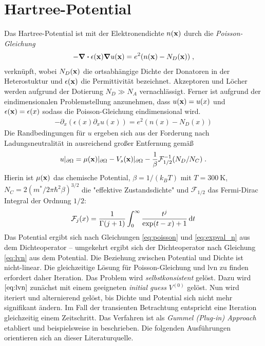 \section{Hartree-Potential}\label{sec:A_4}
Das Hartree-Potential ist mit der Elektronendichte $n(\vb{x})$ durch die \emph{Poisson-Gleichung} \cite{frensley}
\begin{align}
  -\div \epsilon(\vb{x}) \grad u(\vb{x}) = e^2 (n(\vb{x}) - N_D(\vb{x})) \; ,
  \label{eq:poisson_3d}
\end{align}
verknüpft, wobei $N_D(\vb{x})$ die ortsabhängige Dichte der Donatoren in der Heterostuktur und $\epsilon(\vb{x})$ die Permittivität bezeichnet. Akzeptoren und Löcher werden aufgrund der Dotierung $N_D \gg N_A$ vernachlässigt. Ferner ist aufgrund der eindimensionalen Problemstellung anzunehmen, dass $u(\vb{x}) = u(x)$ und $\epsilon(\vb{x})=\epsilon(x)$ sodass die Poisson-Gleichung eindimensional wird.
\begin{align}
  -\partial_x (\epsilon(x)\partial_x u(x)) = e^2(n(x)-N_D(x))
  \label{eq:poisson}
\end{align}
Die Randbedingungen für $u$ ergeben sich aus der Forderung nach Ladungsneutralität in ausreichend großer Entfernung gemäß \cite{frensley}
\begin{align}
  u|_{\partial\Omega} = \mu(\vb{x})|_{\partial\Omega}-V_s(\vb{x})|_{\partial\Omega}-\frac{1}{\beta}\mathcal{F}_{1/2}^{-1}(N_D/N_C) \; .
  \label{eq:RB_PE}
\end{align}
Hierin ist $\mu(\vb{x})$ das chemische Potential, $\beta=1/(k_BT)$ mit $T=\SI{300}{\kelvin}$, $N_C = 2(m^*/2\pi\hbar^2\beta)^{3/2}$ die "effektive Zustandsdichte" und $\mathcal{F}_{1/2}$ das Fermi-Dirac Integral der Ordnung $1/2$:
\begin{align}
  \mathcal{F}_j(x)=\frac{1}{\Gamma(j+1)}\int_0^{\infty}\frac{t^j}{\exp(t-x)+1}\mathop{}\!\mathrm{d} t
\end{align}
Das Potential ergibt sich nach Gleichungen \eqref{eq:poisson} und \eqref{eq:expval_n} aus dem Dichteoperator -- umgekehrt ergibt sich der Dichteoperator nach Gleichung \eqref{eq:lvn} aus dem Potential. Die Beziehung zwischen Potential und Dichte ist nicht-linear. Die gleichzeitige Lösung für Poisson-Gleichung und \ac{lvn} zu finden erfordert daher Iteration. Das Problem wird \emph{selbstkonsistent} gelöst. Dazu wird $\eqref{eq:lvn}$ zunächst mit einem geeigneten \emph{initial guess} $V^{(0)}$ gelöst. Nun wird iteriert und alternierend gelöst, bis Dichte und Potential sich nicht mehr signifikant ändern. Im Fall der transienten Betrachtung entspricht eine Iteration gleichzeitig einem Zeitschritt. Das Verfahren ist als \emph{Gummel (Plug-in) Approach} etabliert und beispielsweise in \cite{gummel} beschrieben. Die folgenden Ausführungen orientieren sich an dieser Literaturquelle.

